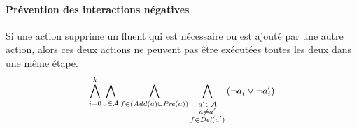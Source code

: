 \paragraph*{Prévention des interactions négatives}

Si une action supprime un fluent qui est nécessaire ou est ajouté par une autre action, alors ces deux actions ne peuvent pas être exécutées toutes les deux dans une même étape.
\[ \bigwedge\limits_{\substack{i=0}}^{k} \bigwedge\limits_{\substack{a \in \mathcal{A}}} \bigwedge\limits_{\substack{f\in \left(\mathit{Add}(a) \cup \mathit{Pre}(a)\right)}} \bigwedge\limits_{\substack{a' \in \mathcal{A} \\ a \neq a' \\ f \in \mathit{Del}(a')}}\left(\neg a_{i} \vee \neg a'_{i}\right) \]
